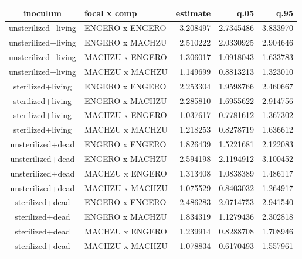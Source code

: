 \begin{table}[t]
\fontsize{12.0pt}{14.4pt}\selectfont
\begin{tabular*}{\linewidth}{@{\extracolsep{\fill}}clrrr}
\toprule
inoculum & focal x comp & estimate & q.05 & q.95 \\ 
\midrule\addlinespace[2.5pt]
unsterilized+living & ENGERO x ENGERO & 3.208497 & 2.7345486 & 3.833970 \\ 
unsterilized+living & ENGERO x MACHZU & 2.510222 & 2.0330925 & 2.904646 \\ 
unsterilized+living & MACHZU x ENGERO & 1.306017 & 1.0918043 & 1.633783 \\ 
unsterilized+living & MACHZU x MACHZU & 1.149699 & 0.8813213 & 1.323010 \\ 
sterilized+living & ENGERO x ENGERO & 2.253304 & 1.9598766 & 2.460667 \\ 
sterilized+living & ENGERO x MACHZU & 2.285810 & 1.6955622 & 2.914756 \\ 
sterilized+living & MACHZU x ENGERO & 1.037617 & 0.7781612 & 1.367302 \\ 
sterilized+living & MACHZU x MACHZU & 1.218253 & 0.8278719 & 1.636612 \\ 
unsterilized+dead & ENGERO x ENGERO & 1.826439 & 1.5221681 & 2.122083 \\ 
unsterilized+dead & ENGERO x MACHZU & 2.594198 & 2.1194912 & 3.100452 \\ 
unsterilized+dead & MACHZU x ENGERO & 1.313408 & 1.0838389 & 1.486117 \\ 
unsterilized+dead & MACHZU x MACHZU & 1.075529 & 0.8403032 & 1.264917 \\ 
sterilized+dead & ENGERO x ENGERO & 2.486283 & 2.0714753 & 2.941540 \\ 
sterilized+dead & ENGERO x MACHZU & 1.834319 & 1.1279436 & 2.302818 \\ 
sterilized+dead & MACHZU x ENGERO & 1.239914 & 0.8288708 & 1.708946 \\ 
sterilized+dead & MACHZU x MACHZU & 1.078834 & 0.6170493 & 1.557961 \\ 
\bottomrule
\end{tabular*}
\end{table}

